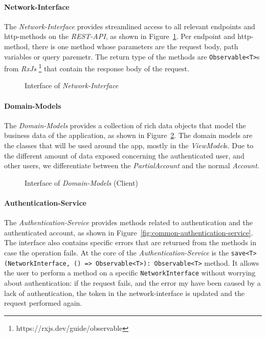 \paragraph{Network-Interface}\label{par:common-networkinterface}
The \textit{Network-Interface} provides streamlined access to all relevant endpoints and http-methods on the \textit{REST-API}, as shown in Figure~\ref{fig:common-networkinterface}.
Per endpoint and http-method, there is one method whose parameters are the request body, path variables or query paremetr.
The return type of the methods are \texttt{Observable<T>}s from \textit{RxJs} \footnote{https://rxjs.dev/guide/observable} that contain the response body of the request.

\begin{figure}
    \centering

    \caption{Interface of \textit{Network-Interface}}
    \label{fig:common-networkinterface}
\end{figure}

\paragraph{Domain-Models}\label{par:common-domain-models}
The \textit{Domain-Models} provides a collection of rich data objects that model the business data of the application, as shown in Figure~\ref{fig:common-domain-models}.
The domain models are the classes that will be used around the app, mostly in the \textit{ViewModel}s. \newline
Due to the different amount of data exposed concerning the authenticated user, and other users, we differentiate between the \textit{PartialAccount} and the normal \textit{Account}.

\begin{figure}
    \centering

    \caption{Interface of \textit{Domain-Models} (Client)}
    \label{fig:common-domain-models}
\end{figure}

\paragraph{Authentication-Service}\label{par:common-authentication-service}
The \textit{Authentication-Service} provides methods related to authentication and the authenticated account, as shown in Figure~\ref{fig:common-authentication-service}. \newline
The interface also contains specific errors that are returned from the methods in case the operation fails. \newline
At the core of the \textit{Authentication-Service} is the \texttt{save<T>(NetworkInterface, () => Observable<T>): Observable<T>} method.
It allows the user to perform a method on a specific \texttt{NetworkInterface} without worrying about authentication: if the request fails, and the error my have been caused by a lack of authentication, the token in the network-interface is updated and the request performed again.

